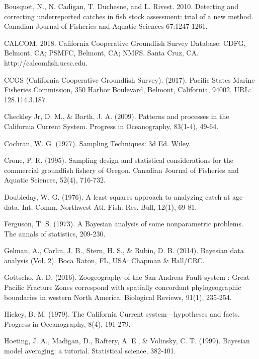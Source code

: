 \documentclass[12pt]{article}
\begin{document}
%
\begin{thebibliography}{1}
%
 Bousquet, N., N. Cadigan, T. Duchesne, and L. Rivest. 
2010. Detecting and correcting underreported catches in fish stock assessment: 
trial of a new method. Canadian Journal of Fisheries and Aquatic Sciences 
67:1247-1261.

 CALCOM, 2018. California Cooperative Groundfish Survey 
Database: CDFG, Belmont, CA; PSMFC, Belmont, CA; NMFS, Santa Cruz, CA. 
http://calcomfish.ucsc.edu.

%
 CCGS (California Cooperative Groundfish Survey). (2017). 
Pacific States Marine Fisheries Commission, 350 Harbor Boulevard, Belmont, 
California, 94002. URL:  128.114.3.187.

%
 Checkley Jr, D. M., \& Barth, J. A. (2009). Patterns and processes in 
the California Current System. Progress in Oceanography, 83(1-4), 49-64.

%
 Cochran, W. G. (1977). Sampling Techniques: 3d Ed. Wiley.

%
 Crone, P. R. (1995). Sampling design and statistical 
considerations for the commercial groundfish fishery of Oregon. Canadian 
Journal of Fisheries and Aquatic Sciences, 52(4), 716-732.

%
 Doubleday, W. G. (1976). A least squares approach to 
analyzing catch at age data. Int. Comm. Northwest Atl. Fish. Res. Bull, 12(1), 
69-81.

%
 Ferguson, T. S. (1973). A Bayesian analysis of some nonparametric 
problems. The annals of statistics, 209-230.

%
 Gelman, A., Carlin, J. B., Stern, H. S., \& Rubin, D. B. 
(2014). Bayesian data analysis (Vol. 2). Boca Raton, FL, USA: Chapman \& 
Hall/CRC.

%
 Gottscho, A. D. (2016). Zoogeography of the San Andreas Fault system
: Great Pacific Fracture Zones correspond with spatially concordant 
phylogeographic boundaries in western North America. Biological Reviews, 91(1), 
235-254.

%
 Hickey, B. M. (1979). The California Current 
system—hypotheses and facts. Progress in Oceanography, 8(4), 191-279.

%
 Hoeting, J. A., Madigan, D., Raftery, A. E., \& Volinsky, C. T. 
(1999). Bayesian model averaging: a tutorial. Statistical science, 382-401.


\end{thebibliography}
\end{document}
